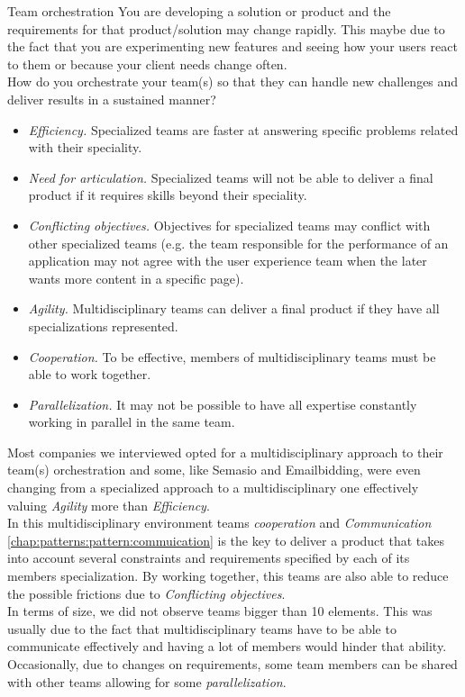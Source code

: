 \begin{pattern}{Team orchestration} \label{chap:patterns:pattern:team}
    \context
        You are developing a solution or product and the requirements for that product/solution may change rapidly. This maybe due to the fact that you are experimenting new features and seeing how your users react to them or because your client needs change often. \\
    \problem
        How do you orchestrate your team(s) so that they can handle new challenges and deliver results in a sustained manner?
    \forces
        \begin{itemize}
                \item \textit{Efficiency.} Specialized teams are faster at answering specific problems related with their speciality.
                \item \textit{Need for articulation.} Specialized teams will not be able to deliver a final product if it requires skills beyond their speciality.
                \item \textit{Conflicting objectives.} Objectives for specialized teams may conflict with other specialized teams (e.g. the team responsible for the performance of an application may not agree with the user experience team when the later wants more content in a specific page).
                \item \textit{Agility.} Multidisciplinary teams can deliver a final product if they have all specializations represented.
                \item \textit{Cooperation.} To be effective, members of multidisciplinary teams must be able to work together.
                \item \textit{Parallelization.} It may not be possible to have all expertise constantly working in parallel in the same team.
        \end{itemize}
    \solution
    Most companies we interviewed opted for a multidisciplinary approach to their team(s) orchestration and some, like Semasio and Emailbidding, were even changing from a specialized approach to a multidisciplinary one effectively valuing \textit{Agility} more than \textit{Efficiency}. \\
    In this multidisciplinary environment teams \textit{cooperation} and \textit{Communication} \ref{chap:patterns:pattern:commuication} is the key to deliver a product that takes into account several constraints and requirements specified by each of its members specialization. By working together, this teams are also able to reduce the possible frictions due to \textit{Conflicting objectives}. \\
    In terms of size, we did not observe teams bigger than 10 elements. This was usually due to the fact that multidisciplinary teams have to be able to communicate effectively and having a lot of members would hinder that ability. \\
    Occasionally, due to changes on requirements, some team members can be shared with other teams allowing for some \textit{parallelization}.
\end{pattern}
